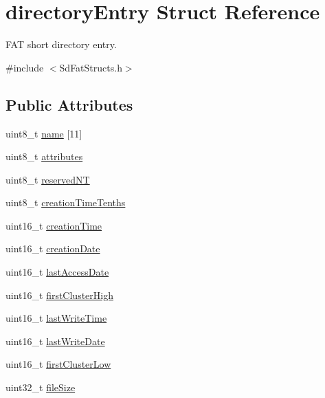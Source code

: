 \hypertarget{structdirectory_entry}{}\section{directory\+Entry Struct Reference}
\label{structdirectory_entry}


F\+AT short directory entry.  




{\ttfamily \#include $<$Sd\+Fat\+Structs.\+h$>$}

\subsection*{Public Attributes}
\begin{DoxyCompactItemize}
\item 
uint8\+\_\+t \hyperlink{structdirectory_entry_a05dc993ea55a1a742de5970541a31ecb}{name} \mbox{[}11\mbox{]}
\item 
uint8\+\_\+t \hyperlink{structdirectory_entry_a16c6cde55c8175c90935c386f1cfb21a}{attributes}
\item 
uint8\+\_\+t \hyperlink{structdirectory_entry_afe7d00be85f3b78549b21610050da52b}{reserved\+NT}
\item 
uint8\+\_\+t \hyperlink{structdirectory_entry_aa5e1ce5b411b88f005b28a3e7c7c5af6}{creation\+Time\+Tenths}
\item 
uint16\+\_\+t \hyperlink{structdirectory_entry_a622bfa70c2cd9006108d7473d737a953}{creation\+Time}
\item 
uint16\+\_\+t \hyperlink{structdirectory_entry_a7b43372794655fe6604d3c17c02302fe}{creation\+Date}
\item 
uint16\+\_\+t \hyperlink{structdirectory_entry_abca70dc5c5fcbe199fd78df010111331}{last\+Access\+Date}
\item 
uint16\+\_\+t \hyperlink{structdirectory_entry_a3b492598b2b05e8425d2a500443613bd}{first\+Cluster\+High}
\item 
uint16\+\_\+t \hyperlink{structdirectory_entry_a7bab435322d1928f66fbce53ee1f402d}{last\+Write\+Time}
\item 
uint16\+\_\+t \hyperlink{structdirectory_entry_a12b2e7cf87482a942a0b5d3df6c51468}{last\+Write\+Date}
\item 
uint16\+\_\+t \hyperlink{structdirectory_entry_a74bd660417a9c3501eae353326c14bb9}{first\+Cluster\+Low}
\item 
uint32\+\_\+t \hyperlink{structdirectory_entry_ac2445d99b50f925f662952e0ccd26a02}{file\+Size}
\end{DoxyCompactItemize}



